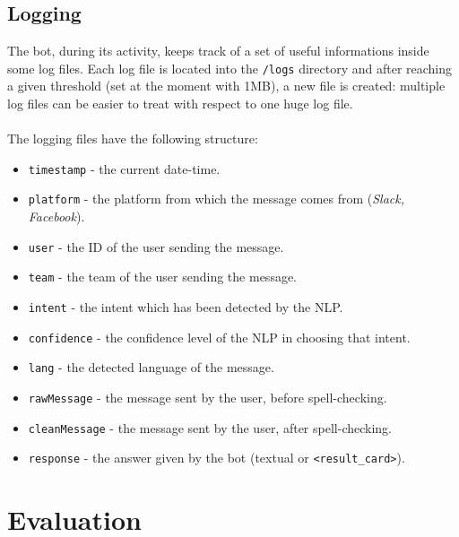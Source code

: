 \documentclass[a4paper,12pt]{report}
\begin{document}
	\section{Logging}
	The bot, during its activity, keeps track of a set of useful informations inside some log files. Each log file is located into the \texttt{/logs} directory and after reaching a given threshold (set at the moment with 1MB), a new file is created: multiple log files can be easier to treat with respect to one huge log file.\\\\
	The logging files have the following structure:
	\begin{itemize}
		\item \texttt{timestamp} - the current date-time.
		\item \texttt{platform} - the platform from which the message comes from (\textit{Slack, Facebook}).
		\item \texttt{user} - the ID of the user sending the message.
		\item \texttt{team} - the team of the user sending the message.
		\item \texttt{intent} - the intent which has been detected by the NLP.
		\item \texttt{confidence} - the confidence level of the NLP in choosing that intent.
		\item \texttt{lang} - the detected language of the message.
		\item \texttt{rawMessage} - the message sent by the user, before spell-checking.
		\item \texttt{cleanMessage} - the message sent by the user, after spell-checking.
		\item \texttt{response} - the answer given by the bot (textual or \texttt{<result\_card>}).
	\end{itemize}
	
	\chapter{Evaluation}
	
\end{document}
